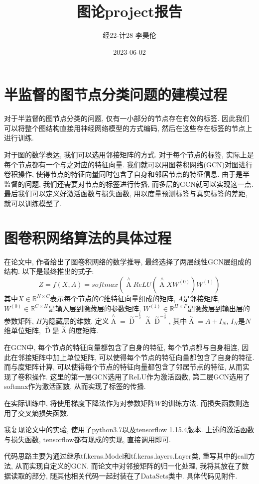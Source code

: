 \documentclass{article}
\title{图论project报告}
\author{经22-计28 李昊伦}
\date{2023-06-02}
\begin{document}
\maketitle
\section{半监督的图节点分类问题的建模过程}
对于半监督的图节点分类的问题, 仅有一小部分的节点存在有效的标签. 
因此我们可以将整个图结构直接用神经网络模型的方式编码, 然后在这些存在标签的节点上进行训练.

对于图的数学表达, 我们可以选用邻接矩阵的方式. 对于每个节点的标签, 实际上是每个节点都有一个与之对应的特征向量.
我们就可以用图卷积网络(GCN)对图进行卷积操作, 使得节点的特征向量同时包含了自身和邻居节点的特征信息.
由于是半监督的问题, 我们还需要对节点的标签进行传播, 而多层的GCN就可以实现这一点.
最后我们可以定义好激活函数与损失函数, 用以度量预测标签与真实标签的差距, 就可以训练模型了.
\section{图卷积网络算法的具体过程}
在论文中, 作者给出了图卷积网络的数学推导, 最终选择了两层线性GCN层组成的结构. 以下是最终推出的式子:
$$Z=f(X,A)=softmax(\mathop{A}\limits^{\wedge}ReLU(\mathop{A}\limits^{\wedge}XW^{(0)})W^{(1)})$$
其中$X\in \mathbb{R}^{N \times C}$表示每个节点的$C$维特征向量组成的矩阵, $A$是邻接矩阵, $W^{(0)}\in\mathbb{R}^{C \times H}$是输入层到隐藏层的参数矩阵, $W^{(1)}\in\mathbb{R}^{H \times F}$是隐藏层到输出层的参数矩阵, $H$为隐藏层的维数.
定义$\mathop{A}\limits^{\wedge}={\mathop{D}\limits^{\sim}}^{-\frac{1}{2}}\mathop{A}\limits^{\sim}{\mathop{D}\limits^{\sim}}^{-\frac{1}{2}}$,
其中$\mathop{A}\limits^{\sim}=A+I_N$, $I_N$是$N$维单位矩阵, $\mathop{D}\limits^{\sim}$是$\mathop{A}\limits^{\sim}$的度矩阵.

在GCN中, 每个节点的特征向量都包含了自身的特征, 每个节点都与自身相连, 因此在邻接矩阵中加上单位矩阵, 可以使得每个节点的特征向量都包含了自身的特征.
而与度矩阵计算, 可以使得每个节点的特征向量都包含了邻居节点的特征, 从而实现了卷积操作.
这里的第一层GCN选用了ReLU作为激活函数, 第二层GCN选用了softmax作为激活函数, 从而实现了标签的传播.

在实际训练中, 将使用梯度下降法作为对参数矩阵$W$的训练方法. 而损失函数则选用了交叉熵损失函数.

我复现论文中的实验, 使用了python3.7以及tensorflow 1.15.4版本.
上述的激活函数与损失函数, tensorflow都有现成的实现, 直接调用即可.

代码思路主要为通过继承tf.keras.Model和tf.keras.layers.Layer类, 重写其中的call方法, 从而实现自定义的GCN.
而论文中对邻接矩阵的归一化处理, 我将其放在了数据读取的部分, 随其他相关代码一起封装在了DataSets类中.
具体代码见附件.
\end{document}
